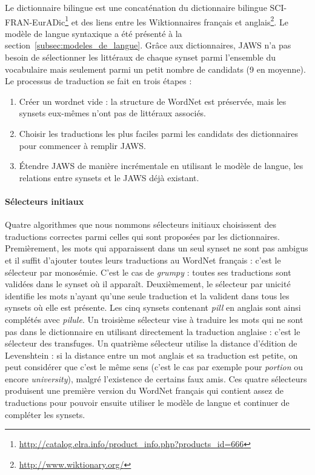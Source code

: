 Le dictionnaire bilingue est une concaténation du dictionnaire bilingue
SCI-FRAN-EurADic\footnote{\url{http://catalog.elra.info/product_info.php?products_id=666}}
et des liens entre les Wiktionnaires français et
anglais\footnote{\url{http://www.wiktionary.org/}}. Le modèle de langue
syntaxique a été présenté à la section~\ref{subsec:modeles_de_langue}. Grâce
aux dictionnaires, JAWS n'a pas besoin de sélectionner les littéraux de chaque
synset parmi l'ensemble du vocabulaire mais seulement parmi un petit nombre de
candidats (9 en moyenne).  Le processus de traduction se fait en trois étapes :
\begin{enumerate} \item Créer un wordnet vide : la structure de WordNet est
préservée, mais les synsets eux-mêmes n'ont pas de littéraux associés.  \item
Choisir les traductions les plus faciles parmi les candidats des dictionnaires
pour commencer à remplir JAWS.  \item Étendre JAWS de manière incrémentale en
utilisant le modèle de langue, les relations entre synsets et le JAWS déjà
existant.  \end{enumerate}

\paragraph{Sélecteurs initiaux} Quatre algorithmes que nous nommons sélecteurs
initiaux choisissent des traductions correctes parmi celles qui sont proposées
par les dictionnaires. Premièrement, les mots qui apparaissent dans un seul
synset ne sont pas ambigus et il suffit d'ajouter toutes leurs traductions au
WordNet français : c'est le sélecteur par monosémie. C'est le cas de
\textit{grumpy} : toutes ses traductions sont validées dans le synset où il
apparaît. Deuxièmement, le sélecteur par unicité identifie les mots n'ayant
qu'une seule traduction et la valident dans tous les synsets où elle est
présente. Les cinq synsets contenant \textit{pill} en anglais sont ainsi
complétés avec \textit{pilule}. Un troisième sélecteur vise à traduire les mots
qui ne sont pas dans le dictionnaire en utilisant directement la traduction
anglaise : c'est le sélecteur des transfuges. Un quatrième sélecteur utilise la
distance d'édition de Levenshtein : si la distance entre un mot anglais et sa
traduction est petite, on peut considérer que c'est le même sens (c'est le cas
par exemple pour \textit{portion} ou encore \textit{university}), malgré
l'existence de certains faux amis. Ces quatre sélecteurs produisent une
première version du WordNet français qui contient assez de traductions pour
pouvoir ensuite utiliser le modèle de langue et continuer de compléter les
synsets.

